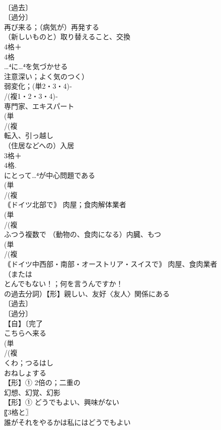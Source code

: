 \documentclass[8pt]{extreport}
\begin{document}
\begin{CJK}{UTF8}{min}
\\	〔過去〕
\\	〔過分〕
\\	再び来る；（病気が）再発する
\\	（新しいものと）取り替えること、交換 
\\	4格＋
\\	4格 
\\	…⁴に…⁴を気づかせる 
\\	注意深い；よく気のつく）
\\	弱変化；(単2・3・4)‐
\\	/(複1・2・3・4)‐
\\	専門家、エキスパート 
\\	(単
\\	/(複
\\	転入、引っ越し 
\\	（住居などへの）入居 
\\	3格＋
\\	4格.	
\\	にとって…⁴が中心問題である
\\	(単
\\	/(複
\\	｟ドイツ北部で｠ 肉屋；食肉解体業者 
\\	(単
\\	/(複
\\	ふつう複数で （動物の、食肉になる）内臓、もつ 
\\	(単
\\	/(複
\\	｟ドイツ中西部・南部・オーストリア・スイスで｠ 肉屋、食肉業者 
\\	（または
\\	とんでもない！；何を言うんですか！
\\	の過去分詞）【形】親しい、友好〈友人〉関係にある 
\\	〔過去〕
\\	〔過分〕
\\	【自】〔完了
\\	こちらへ来る 
\\	(単
\\	/(複
\\	くわ；つるはし 
\\	おねしょする
\\	【形】① 2倍の；二重の 
\\	幻想、幻覚、幻影
\\	【形】① どうでもよい、興味がない 
\\	〖3格と〗
\\	誰がそれをやるかは私にはどうでもよい

\end{CJK}
\end{document}
